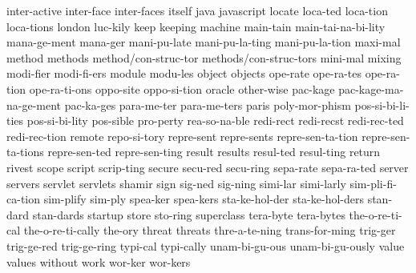 {    inter-active
    inter-face
    inter-faces
    itself
    java
    javascript
    locate
    loca-ted
    loca-tion
    loca-tions
    london
    luc-kily
    keep
    keeping
    machine
    main-tain
    main-tai-na-bi-lity
    mana-ge-ment
    mana-ger
    mani-pu-late
    mani-pu-la-ting
    mani-pu-la-tion
    maxi-mal
    method
    methods
    method/con-struc-tor
    methods/con-struc-tors
    mini-mal
    mixing
    modi-fier
    modi-fi-ers
    module
    modu-les
    object
    objects
    ope-rate
    ope-ra-tes
    ope-ra-tion
    ope-ra-ti-ons
    oppo-site
    oppo-si-tion
    oracle
    other-wise
    pac-kage
    pac-kage-ma-na-ge-ment
    pac-ka-ges
    para-me-ter
    para-me-ters
    paris
    poly-mor-phism
    pos-si-bi-li-ties
    pos-si-bi-lity
    pos-sible
    pro-perty
    rea-so-na-ble
    redi-rect
    redi-recst
    redi-rec-ted
    redi-rec-tion
    remote
    repo-si-tory
    repre-sent
    repre-sents
    repre-sen-ta-tion
    repre-sen-ta-tions
    repre-sen-ted
    repre-sen-ting
    result
    results
    resul-ted
    resul-ting
    return
    rivest
    scope
    script
    scrip-ting
    secure
    secu-red
    secu-ring
    sepa-rate
    sepa-ra-ted
    server
    servers
    servlet
    servlets
    shamir
    sign
    sig-ned
    sig-ning
    simi-lar
    simi-larly
    sim-pli-fi-ca-tion
    sim-plify
    sim-ply
    spea-ker
    spea-kers
    sta-ke-hol-der
    sta-ke-hol-ders
    stan-dard
    stan-dards
    startup
    store
    sto-ring
    superclass
    tera-byte
    tera-bytes
    the-o-re-ti-cal
    the-o-re-ti-cally
    the-ory
    threat
    threats
    thre-a-te-ning
    trans-for-ming
    trig-ger
    trig-ge-red
    trig-ge-ring
    typi-cal
    typi-cally
    unam-bi-gu-ous
    unam-bi-gu-ously
    value
    values
    without
    work
    wor-ker
    wor-kers
}
